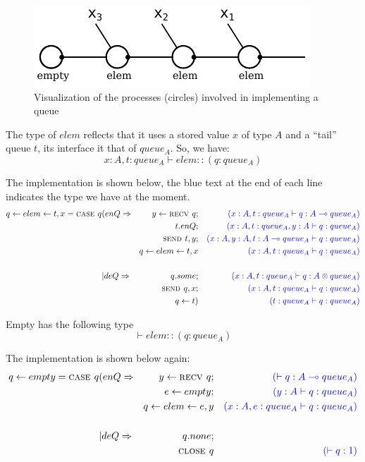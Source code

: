 \documentclass{article}
\begin{document}
	\begin{figure}
		\centering
		\includegraphics[width=0.7\linewidth]{pictures/jun-19/drawing-processes}
		\caption{Visualization of the processes (circles) involved in implementing a queue}
		\label{fig:drawing-processes}
	\end{figure}
	
	
	The type of \(elem\) reflects that it uses a stored value \(x\) of type \(A\) and a ``tail'' queue \(t\), its interface it that of \(queue_A\). So, we have:
	\[ x:A, t:queue_A \vdash elem :: (q:queue_A) \]
	
	The implementation is shown below, the blue text at the end of each line indicates the type we have at the moment. 
	\begin{align*}
		q \leftarrow elem \leftarrow t,x = \textsc{case } q 
		&(enQ \Rightarrow 
		&y \leftarrow \textsc{recv } q; 
		&& {\color{blue} (x:A, t:queue_A \vdash q:A \multimap queue_A)}\\
		&                 &t.enQ;  
		&& {\color{blue}\qquad (x:A,t:queue_A,y:A\vdash q:queue_A)}\\
		&                 &\textsc{send }t,y;  
		&& {\color{blue}(x:A,y:A,t:A \multimap queue_A\vdash q:queue_A)}\\
		&                 & q \leftarrow elem \leftarrow t,x
		&& {\color{blue}(x:A,t:queue_A\vdash q:queue_A)}\\[1.5em]
		&| deQ \Rightarrow 
		& q.some; 
		&& {\color{blue} (x:A, t:queue_A \vdash q:A \otimes queue_A)}\\
		&& \textsc{send }q,x ; 
		&& {\color{blue} (x:A, t:queue_A \vdash q:queue_A)}\\
		&& q \leftarrow t)
		&& {\color{blue} (t:queue_A \vdash q:queue_A)}
		\end{align*}
		
		
	Empty has the following type
	\[ \vdash elem :: (q:queue_A) \]

	The implementation is shown below again:
		\begin{align*}
	q \leftarrow empty = \textsc{case } q 
	&(enQ \Rightarrow 
	&y \leftarrow \textsc{recv } q; 
	&& {\color{blue} (\vdash q:A \multimap queue_A)}\\
	&                 &e \leftarrow empty;  
	&& {\color{blue}\qquad (y:A\vdash q:queue_A)}\\
	&                 & q \leftarrow elem \leftarrow e,y
	&& {\color{blue}(x:A,e:queue_A\vdash q:queue_A)}\\[1.5em]
	&| deQ \Rightarrow 
	& q.none; 
	&& \\
	&& \textsc{close }q 
	&& {\color{blue} (\vdash q:1)}
	\end{align*}
	
\end{document}
